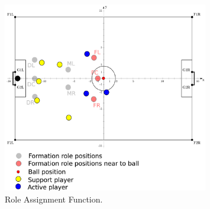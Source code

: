 \begin{figure}[htb!]
\centering
  \includegraphics[width=0.8\textwidth]{Chapter4/figures/RoleAss.pdf}
  \caption{Role Assignment Function.} 
  \label{fig:RoleAss}
\end{figure}


